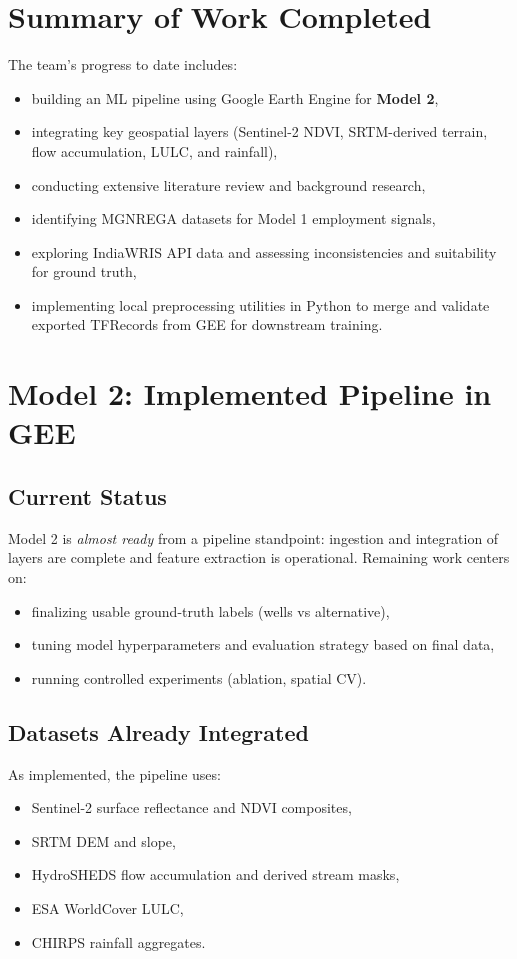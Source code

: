 \documentclass[12pt,a4paper]{report}
\begin{document}
\section{Summary of Work Completed}
The team’s progress to date includes:
\begin{itemize}
  \item building an ML pipeline using Google Earth Engine for \textbf{Model 2},
  \item integrating key geospatial layers (Sentinel-2 NDVI, SRTM-derived terrain, flow accumulation, LULC, and rainfall),
  \item conducting extensive literature review and background research,
  \item identifying MGNREGA datasets for Model 1 employment signals,
  \item exploring IndiaWRIS API data and assessing inconsistencies and suitability for ground truth,
  \item implementing local preprocessing utilities in Python to merge and validate exported TFRecords from GEE for downstream training.
\end{itemize}

\section{Model 2: Implemented Pipeline in GEE}
\subsection{Current Status}
Model 2 is \textit{almost ready} from a pipeline standpoint: ingestion and integration of layers are complete and feature extraction is operational. Remaining work centers on:
\begin{itemize}
  \item finalizing usable ground-truth labels (wells vs alternative),
  \item tuning model hyperparameters and evaluation strategy based on final data,
  \item running controlled experiments (ablation, spatial CV).
\end{itemize}

\subsection{Datasets Already Integrated}
As implemented, the pipeline uses:
\begin{itemize}
  \item Sentinel-2 surface reflectance and NDVI composites,
  \item SRTM DEM and slope,
  \item HydroSHEDS flow accumulation and derived stream masks,
  \item ESA WorldCover LULC,
  \item CHIRPS rainfall aggregates.
\end{itemize}
\end{document}
